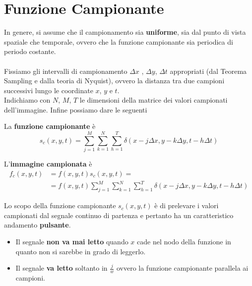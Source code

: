 \section{Funzione Campionante}
In genere, si assume che il campionamento sia \textbf{uniforme}, sia dal punto
di vista spaziale che temporale, ovvero che la funzione campionante sia
periodica di periodo costante. \\\\Fissiamo gli intervalli di campionamento
$\Delta x$ , $\Delta y$, $\Delta t$ appropriati (dal Teorema Sampling e dalla
teoria di Nyquist), ovvero la distanza tra due campioni successivi lungo le
coordinate $x$, $y$ e $t$.\\Indichiamo con $N$, $M$, $T$ le dimensioni della
matrice dei valori campionati dell'immagine. Infine possiamo dare le seguenti

\begin{definition}
    La \textbf{funzione campionante} è
    $$
        s_c(x,y,t) = \sum_{j=1}^{M} \sum_{k=1}^{N}\sum_{h=1}^{T} \delta (x-j\Delta x, y - k
        \Delta y, t - h  \Delta t )
    $$
\end{definition}

\begin{definition}
    L'\textbf{immagine campionata} è
    \begin{equation}
        \begin{aligned}
            f_c(x,y,t) & = f(x,y,t)s_c(x,y,t) =                                                                                         \\
                       & = f(x,y,t) \sum_{j=1}^{M} \sum_{k=1}^{N}\sum_{h=1}^{T} \delta (x-j \Delta x, y - k \Delta y, t - h  \Delta t )
        \end{aligned}
    \end{equation}
\end{definition}

Lo scopo della funzione campionante $s_c(x , y, t)$ è di prelevare i valori
campionati dal segnale continuo di partenza e pertanto ha un caratteristico
andamento \textbf{pulsante}.

\begin{itemize}
    \item Il segnale \textbf{non va mai letto} quando $x$ cade nel nodo della
          funzione in quanto non si sarebbe in grado di leggerlo.
    \item Il segnale \textbf{va letto} soltanto in $\frac{j}{w}$ ovvero la
          funzione campionante parallela ai campioni.
\end{itemize}

